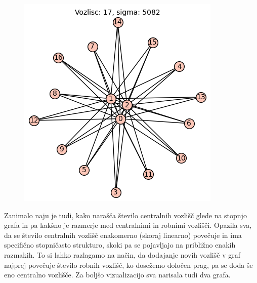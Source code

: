 \documentclass[a4paper,12pt]{article}
\begin{document}
\begin{figure}[h]
\begin{minipage}[b]{0.32\textwidth}
      \end{minipage}
      \hfill
      \begin{minipage}[b]{0.32\textwidth}
          \centering
          \includegraphics[width=\textwidth]{graf_tri_centralna.png}
      \end{minipage}
  \end{figure}  

Zanimalo naju je tudi, kako narašča število centralnih vozlišč glede na stopnjo grafa in pa kakšno je razmerje med centralnimi 
in robnimi vozlišči. Opazila sva, da se število centralnih vozlišč enakomerno (skoraj linearno) povečuje in ima specifično 
stopničasto strukturo, skoki pa se pojavljajo na približno enakih razmakih. To si lahko razlagamo na način, da dodajanje novih 
vozlišč v graf najprej povečuje število robnih vozlišč, ko dosežemo določen prag, pa se doda še eno centralno vozlišče. 
Za boljšo vizualizacijo sva narisala tudi dva grafa.
\end{document}
